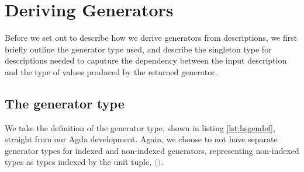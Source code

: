 \documentclass[a4paper,msc,twosized=semi]{uustthesis}
\newcommand*{\mathcolor}{}
\def\mathcolor#1#{\mathcoloraux{#1}}
\newcommand*{\mathcoloraux}[3]{%
  \protect\leavevmode
  \begingroup
    \color#1{#2}#3%
  \endgroup
}
\newcommand{\HSSpecial}[1]{\mathcolor{hsblue4}{#1}}
\begin{document}
\section{Deriving Generators}

  Before we set out to describe how we derive generators from descriptions, we first 
  briefly outline the generator type used, and describe the singleton type for 
  descriptions needed to caputure the dependency between the input description and the 
  type of values produced by the returned generator. 

\subsection{The generator type}

  We take the definition of the generator type, shown in listing \ref{lst:hsgendef}, 
  straight from our Agda development. Again, we choose to not have separate generator 
  types for indexed and non-indexed generators, representing non-indexed types as 
  types indexed by the unit tuple, \ensuremath{\HSSpecial{(}\HSSpecial{)}}. 
\end{document}
